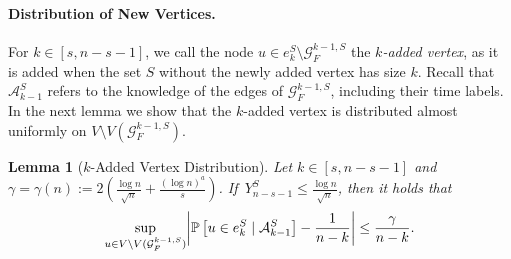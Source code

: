 \documentclass[a4paper,11pt]{article}
\theoremstyle{definition}
\theoremstyle{plain}
\newtheorem{lemma}{Lemma}
\newcommand{\GGG}{\mathcal{G}}
\newcommand{\A}{\mathcal A}
\newcommand{\prob}{\mathbb{P}}
\DeclarePairedDelimiter{\abs}{\lvert}{\rvert}
\begin{document}
\paragraph*{Distribution of New Vertices.}
For $k\in [s, n-s -1]$, we call the node $u\in e_k^S\setminus \GGG_F^{k-1,S}$ the \emph{$k$-added vertex}, as it is added when the set $S$ without the newly added vertex has size $k$.
Recall that $\A_{k-1}^S$ refers to the knowledge of the edges of $\GGG_F^{k-1,S}$, including their time labels.
In the next lemma we show that the $k$-added vertex is distributed almost uniformly on $V\setminus V(\GGG_F^{k-1,S})$.
\begin{lemma}[$k$-Added Vertex Distribution]\label{lem: almost uniform}
  Let $ k \in [s, n-s-1]$ and $\gamma = \gamma(n) := 2\left(\frac{\log n}{\sqrt{n}} + \frac{(\log n)^a}{s}\right)$. 
  If~$Y_{n-s-1}^S \leq \frac{\log n}{\sqrt{n}}$,
  then it holds that
  \[
    \sup_{u \in V\setminus V(\GGG_F^{k-1,S})} \abs*{ \prob \left[ u \in e_k^S \mid \A_{k-1}^S \right] - \frac{1}{n-k}} \leq \frac{\gamma}{n-k}.
  \]
\end{lemma}
\end{document}
